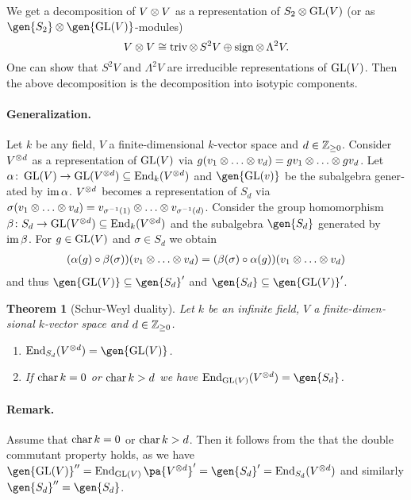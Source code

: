 \documentclass[12pt,a4paper]{scrartcl}
\theoremstyle{cplain}
\theoremstyle{cplain}
\newtheorem{thm}[thmcounter]{Theorem}
\theoremstyle{cplain}
\theoremstyle{definition}
\begin{document}
\begin{otherlanguage}{english}
We get a decomposition of $V\otimes V$ as a representation of $S_2 \otimes \operatorname{GL}(V)$ (or as $\gen{S_2}\tp \gen{\GL(V)}$-modules) \[ V\otimes V \cong \operatorname{triv} \otimes\, S^2V \oplus \operatorname{sign} \otimes\, \Lambda^2V. \] One can show that $S^2V$ and $\Lambda^2V$ are irreducible representations of $\operatorname{GL}(V)$. Then the above decomposition is the decomposition into isotypic components.

\paragraph{Generalization.}
Let $k$ be any field, $V$ a finite-dimensional $k$-vector space and $d\in\mathbb Z_{\ge0}$. Consider $V^{\otimes d}$ as a representation of $\operatorname{GL}(V)$ via $g(v_1\otimes\ldots\otimes v_d) = gv_1\otimes \ldots \otimes gv_d$. Let $\alpha\colon \operatorname{GL}(V) \to \operatorname{GL}(V^{\otimes d}) \subseteq \operatorname{End}_k(V^{\otimes d})$ and $\gen{\GL(v)}$ be the subalgebra generated by $\operatorname{im}\alpha$. $V^{\otimes d}$ becomes a representation of $S_d$ via $\sigma(v_1\otimes \ldots\otimes v_d) = v_{\sigma^{-1}(1)}\otimes \ldots\otimes v_{\sigma^{-1}(d)}$. Consider the group homomorphism $\beta\colon S_d \to \operatorname{GL}(V^{\otimes d}) \subseteq \operatorname{End}_k(V^{\otimes d})$ and the subalgebra $\gen{S_d}$ generated by $\operatorname{im}\beta$. For $g\in \operatorname{GL}(V)$ and $\sigma\in S_d$ we obtain
\begin{align*}
  (\alpha(g) \circ \beta(\sigma))(v_1\otimes \ldots\otimes v_d) = (\beta(\sigma) \circ \alpha(g))(v_1\otimes \ldots\otimes v_d)
\end{align*}
and thus $\gen{\GL(V)} \subseteq \gen{S_d}'$ and $\gen{S_d}\subseteq \gen{\GL(V)}'$.

\begin{thm}[Schur-Weyl duality] \label{thm:schur weyl}
  Let $k$ be an infinite field, $V$ a finite-dimensional $k$-vector space and $d\in\mathbb Z_{\ge0}$.
  \begin{enumerate}
    \item \label{thm:schur weyl:1} $\End_{S_d}(V^{\tp d}) = \gen{\GL(V)}$.
    \item \label{thm:schur weyl:2} If $\operatorname{char} k = 0$ or $\operatorname{char} k > d$ we have $\End_{\GL(V)}(V^{\tp d}) =\gen{S_d}$.
  \end{enumerate}
\end{thm}


\paragraph{Remark.}
Assume that $\operatorname{char} k = 0$ or $\operatorname{char} k > d$. Then it follows from the  that the double commutant property holds, as we have $\gen {\GL(V)}'' = \End_{\GL(V)}\pa{V^{\otimes d}}' = \gen{S_d}' = \End_{S_d}(V^{\otimes d})$ and similarly $\gen{S_d}'' = \gen {S_d}$.


\end{otherlanguage}
\end{document}
